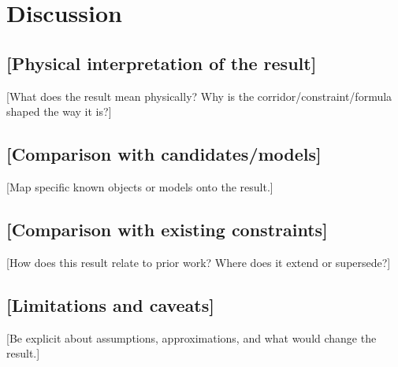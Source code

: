 \section{Discussion}
\label{sec:discussion}


\subsection{[Physical interpretation of the result]}

[What does the result mean physically? Why is the corridor/constraint/formula shaped the way it is?]

\subsection{[Comparison with candidates/models]}

[Map specific known objects or models onto the result.]

\subsection{[Comparison with existing constraints]}

[How does this result relate to prior work? Where does it extend or supersede?]

\subsection{[Limitations and caveats]}

[Be explicit about assumptions, approximations, and what would change the result.]
